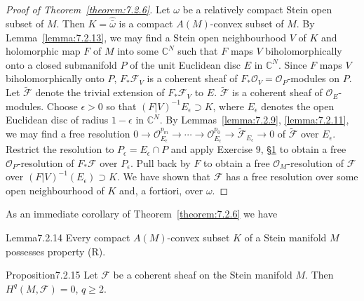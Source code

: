 \begin{proof}[Proof of Theorem~\ref{theorem:7.2.6}]
Let $\omega$ be a relatively compact Stein open subset of $M$. Then $K=\widehat{\bar\omega}$ is a compact $A(M)$-convex subset of $M$. By Lemma~\ref{lemma:7.2.13}, we may find a Stein open neighbourhood $V$ of $K$ and holomorphic map $F$ of $M$ into some $\mathbb C^N$ such that $F$ maps $V$ biholomorphically onto a closed submanifold $P$ of the unit Euclidean disc $E$ in $\mathbb C^N$. Since $F$ maps $V$ biholomorphically onto $P$, $F_*\mathcal F_V$ is a coherent sheaf of $F_*\mathcal O_V=\mathcal O_P$-modules on $P$. Let $\widetilde{\mathcal F}$ denote the trivial extension of $F_*\mathcal F_V$ to $E$. $\widetilde{\mathcal F}$ is a coherent sheaf of $\mathcal O_E$-modules. Choose $\epsilon>0$ so that $(F|V)^{-1}E_\epsilon\supset K$, where $E_\epsilon$ denotes the open Euclidean disc of radius $1-\epsilon$ in $\mathbb C^N$. By Lemmas~\ref{lemma:7.2.9}, \ref{lemma:7.2.11}, we may find a free resolution $0\to\mathcal O_{E_\epsilon}^{p_m}\to\cdots\to\mathcal O_{E_\epsilon}^{p_0}\to\widetilde{\mathcal F}_{E_\epsilon}\to0$ of $\widetilde{\mathcal F}$ over $E_\epsilon$. Restrict the resolution to $P_\epsilon=E_\epsilon\cap P$ and apply Exercise 9, \hyperref[sec:7:1]{\S1} to obtain a free $\mathcal O_P$-resolution of $F_*\mathcal F$ over $P_\epsilon$. Pull back by $F$ to obtain a free $\mathcal O_M$-resolution of $\mathcal F$ over $(F|V)^{-1}(E_\epsilon)\supset K$. We have shown that $\mathcal F$ has a free resolution over some open neighbourhood of $K$ and, a fortiori, over $\omega$.
\end{proof}
As an immediate corollary of Theorem~\ref{theorem:7.2.6} we have
\begin{originaltheorem}{Lemma}{7.2.14}
Every compact $A(M)$-convex subset $K$ of a Stein manifold $M$ possesses property (R).
\end{originaltheorem}
\begin{originaltheorem}{Proposition}{7.2.15}
Let $\mathcal F$ be a coherent sheaf on the Stein manifold $M$. Then $H^q(M,\mathcal F)=0$, $q\geq2$.
\end{originaltheorem}
